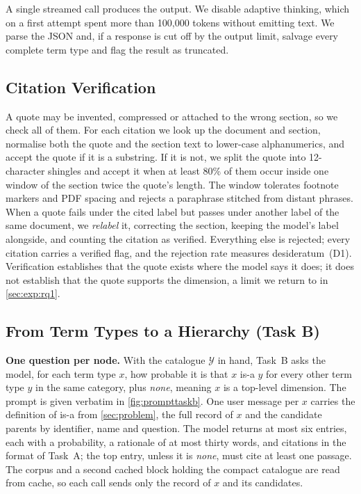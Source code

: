 A single streamed call produces the output. We disable adaptive thinking, which on
a first attempt spent more than 100,000 tokens without emitting text. We parse the JSON and, if a response is cut off by the output limit,
salvage every complete term type and flag the result as truncated.

\subsection{Citation Verification}
\label{sec:method:verify}

A quote may be invented, compressed or attached to the wrong section, so we
check all of them. For each citation we
look up the document and section, normalise both the quote and the section text
to lower-case alphanumerics, and accept the quote if it is a substring. If it is
not, we split the quote into 12-character shingles and accept it when at least
80\% of them occur inside one window of the section twice the quote's length.
The window tolerates footnote markers and PDF spacing and rejects a paraphrase
stitched from distant phrases. When a quote fails under the cited label but
passes under another label of the same document, we \emph{relabel} it,
correcting the section, keeping the model's label alongside, and counting the
citation as verified. Everything else is rejected; every citation carries a
verified flag, and the rejection rate measures desideratum~(D1). Verification establishes that the quote exists where the
model says it does; it does not establish that the quote supports the
dimension, a limit we return to in \cref{sec:exp:rq1}.

\subsection{From Term Types to a Hierarchy (Task B)}
\label{sec:method:hierarchy}

\textbf{One question per node.} With the catalogue $\mathcal{Y}$ in hand, Task~B
asks the model, for each term type $x$, how probable it is that $x$ is-a $y$
for every other term type $y$ in the same category, plus \emph{none}, meaning
$x$ is a top-level dimension. The prompt is given verbatim in
\cref{fig:prompttaskb}. One user message per $x$ carries the definition of
is-a from \cref{sec:problem}, the full record of $x$ and the candidate parents
by identifier, name and question. The model returns at most six entries, each
with a probability, a rationale of at most thirty words, and citations in the
format of Task~A; the top entry, unless it is \emph{none}, must cite at least
one passage. The corpus and a second cached block holding the compact
catalogue are read from cache, so each call sends only the record of $x$ and
its candidates.


